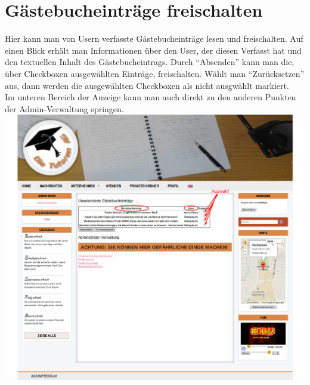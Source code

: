 
\section{Gästebucheinträge freischalten}
Hier kann man von Usern verfasste Gästebucheinträge lesen und freischalten. Auf einen Blick erhält man Informationen über den User, der diesen Verfasst hat und den textuellen Inhalt des Gästebucheintrags.
Durch ``Absenden'' kann man die, über Checkboxen ausgewählten Einträge, freischalten. Wählt man ``Zurücksetzen'' aus, dann werden die ausgewählten Checkboxen als nicht ausgwählt markiert.\\
Im unteren Bereich der Anzeige kann man auch direkt zu den anderen Punkten der Admin-Verwaltung springen.\\
\includegraphics[width=1\textwidth]{../Screenshots/de/admin/admin_guestbook}
